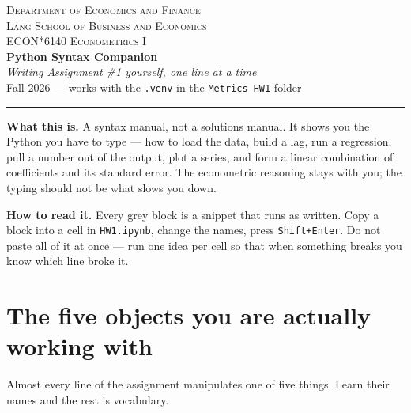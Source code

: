 \documentclass[11pt]{article}
\newcommand{\code}[1]{\texttt{#1}}
\begin{document}
\begin{center}
  {\footnotesize\scshape Department of Economics and Finance\\
   Lang School of Business and Economics}\\[5pt]
  {\large\scshape ECON*6140 Econometrics I}\\[3pt]
  {\LARGE\bfseries Python Syntax Companion}\\[4pt]
  {\itshape Writing Assignment \#1 yourself, one line at a time}\\[3pt]
  {\small Fall 2026 --- works with the \code{.venv} in the \code{Metrics HW1} folder}
\end{center}
\vspace{0.4em}\hrule\vspace{0.5em}

\noindent\textbf{What this is.} A syntax manual, not a solutions manual. It shows
you the Python you have to type --- how to load the data, build a lag, run a
regression, pull a number out of the output, plot a series, and form a linear
combination of coefficients and its standard error. The econometric reasoning
stays with you; the typing should not be what slows you down.

\noindent\textbf{How to read it.} Every grey block is a snippet that runs as
written. Copy a block into a cell in \code{HW1.ipynb}, change the names, press
\code{Shift+Enter}. Do not paste all of it at once --- run one idea per cell so
that when something breaks you know which line broke it.

\vspace{0.6em}
{\small\tableofcontents}

\newpage

\section{The five objects you are actually working with}

Almost every line of the assignment manipulates one of five things. Learn their
names and the rest is vocabulary.
\end{document}
